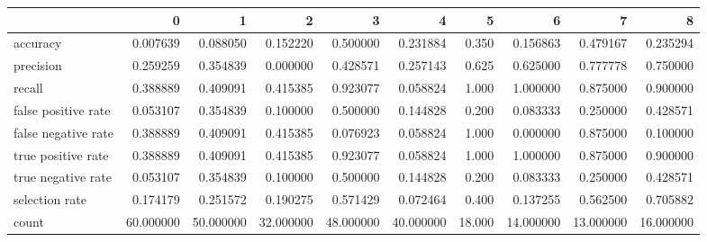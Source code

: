 \begin{tabular}{lrrrrrrrrr}
\toprule
{} &          0 &          1 &          2 &          3 &          4 &       5 &          6 &          7 &          8 \\
\midrule
accuracy            &   0.007639 &   0.088050 &   0.152220 &   0.500000 &   0.231884 &   0.350 &   0.156863 &   0.479167 &   0.235294 \\
precision           &   0.259259 &   0.354839 &   0.000000 &   0.428571 &   0.257143 &   0.625 &   0.625000 &   0.777778 &   0.750000 \\
recall              &   0.388889 &   0.409091 &   0.415385 &   0.923077 &   0.058824 &   1.000 &   1.000000 &   0.875000 &   0.900000 \\
false positive rate &   0.053107 &   0.354839 &   0.100000 &   0.500000 &   0.144828 &   0.200 &   0.083333 &   0.250000 &   0.428571 \\
false negative rate &   0.388889 &   0.409091 &   0.415385 &   0.076923 &   0.058824 &   1.000 &   0.000000 &   0.875000 &   0.100000 \\
true positive rate  &   0.388889 &   0.409091 &   0.415385 &   0.923077 &   0.058824 &   1.000 &   1.000000 &   0.875000 &   0.900000 \\
true negative rate  &   0.053107 &   0.354839 &   0.100000 &   0.500000 &   0.144828 &   0.200 &   0.083333 &   0.250000 &   0.428571 \\
selection rate      &   0.174179 &   0.251572 &   0.190275 &   0.571429 &   0.072464 &   0.400 &   0.137255 &   0.562500 &   0.705882 \\
count               &  60.000000 &  50.000000 &  32.000000 &  48.000000 &  40.000000 &  18.000 &  14.000000 &  13.000000 &  16.000000 \\
\bottomrule
\end{tabular}
